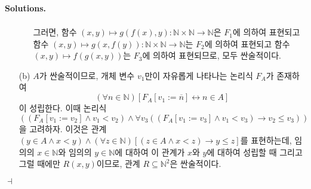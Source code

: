 \documentclass[12pt]{paper}
\newenvironment{context}[1][]{\noindent \textbf{{#1}.}}{\hfill $ \dashv $}
\begin{document}
\begin{context}[Solutions]
\begin{enumerate}
\begin{itemize}
\begin{align*}
        \end{align*}
        그러면, 함수 $\left( x , y \right) \mapsto g \left( f \left( x \right) , y \right) : \mathbb{N} \times \mathbb{N} \to \mathbb{N}$은 $F_1$에 의하여 표현되고
        함수 $\left( x , y \right) \mapsto g \left( x , f \left( y \right) \right) : \mathbb{N} \times \mathbb{N} \to \mathbb{N}$는 $F_2$에 의하여 표현되고
        함수 $\left( x , y \right) \mapsto f \left( g \left( x , y \right) \right)$는 $F_3$에 의하여 표현되므로, 모두 싼술적이다.
      \end{itemize}

      \item[(b)] $A$가 싼술적이므로, 개체 변수 $v_1$만이 자유롭게 나타나는 논리식 $F_A$가 존재하여
      $$ \left( \forall n \in \mathbb{N} \right) \left[ F_A \left[ v_1 := \overline{n} \right] \leftrightarrow n \in A \right] $$이 성립한다.
      이때 논리식 $$\left( \left( F_A \left[ v_1 := v_2 \right] \land v_1 < v_2 \right) \land \forall v_3 \left( \left( F_A \left[ v_1 := v_3 \right] \land v_1 < v_3 \right) \rightarrow v_2 \leq v_3 \right) \right)$$을 고려하자.
      이것은 관계 $ \left( y \in A \land x < y \right) \land \left( \forall z \in \mathbb{N} \right) \left[ \left( z \in A \land x < z \right) \rightarrow y \leq z \right] $를 표현하는데,
      임의의 $x \in \mathbb{N}$와 임의의 $y \in \mathbb{N}$에 대하여 이 관계가 $x$와 $y$에 대하여 성립할 때 그리고 그럴 때에만 $R \left( x , y \right)$이므로, 관계 $R \subseteq \mathbb{N}^{2}$은 싼술적이다.


\end{enumerate}
\end{context}
\end{document}
